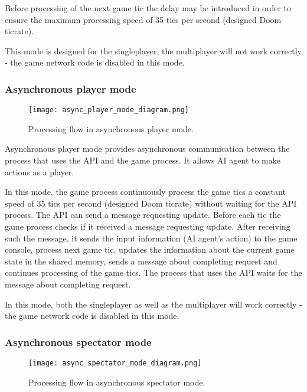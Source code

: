         Before processing of the next game tic the delay may be introduced in order to ensure the maximum processing speed of 35 tics per second (designed Doom ticrate).
        
        This mode is designed for the singleplayer, the multiplayer will not work correctly - the game network code is disabled in this mode.

    \subsubsection{Asynchronous player mode}\label{sec:architecture_async_player_mode}

	    \begin{figure}
			    \centering
			    \texttt{[image: async\_player\_mode\_diagram.png]}
			    \caption{Processing flow in asynchronous player mode.}\label{fig:async_player_mode_diagram}
	    \end{figure}
	    
	    Asynchronous player mode provides asynchronous communication between the process that uses the API and the game process. It allows AI agent to make actions as a player. 
	    
	    In this mode, the game process continuously process the game tics a constant speed of 35 tics per second (designed Doom ticrate) without waiting for the API process. The API can send a message requesting update. Before each tic the game process checks if it received a message requesting update. After receiving such the message, it sends the input information (AI agent's action) to the game console, process next game tic, updates the information about the current game state in the shared memory, sends a message about completing request and continues processing of the game tics. The process that uses the API waits for the message about completing request.
	    
	    In this mode, both the singleplayer as well as the multiplayer will work correctly - the game network code is disabled in this mode.

    \subsubsection{Asynchronous spectator mode}\label{sec:architecture_async_spectator_mode}

	    \begin{figure}
			    \centering
			    \texttt{[image: async\_spectator\_mode\_diagram.png]}
			    \caption{Processing flow in asynchronous spectator mode.}\label{fig:async_spectator_mode_diagram}
	    \end{figure}
	    

